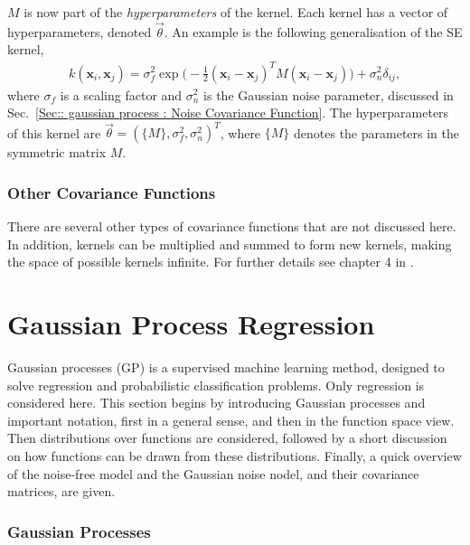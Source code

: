 \documentclass[twoside,english]{uiofysmaster}
\begin{document}
$M$ is now part of the \textit{hyperparameters} of the kernel. Each kernel has a vector of hyperparameters, denoted $\vec{\theta}$. An example is the following generalisation of the SE kernel, 
\begin{align}
k(\textbf{x}_i, \textbf{x}_j) = \sigma_f^2 \exp \big(- \frac{1}{2} (\textbf{x}_i - \textbf{x}_j)^T M (\textbf{x}_i - \textbf{x}_j) \big) + \sigma_n^2 \delta_{ij},
\end{align}
where $\sigma_f$ is a scaling factor and $\sigma_n^2$ is the Gaussian noise parameter, discussed in Sec.~\ref{Sec:: gaussian process : Noise Covariance Function}. The hyperparameters of this kernel are $\vec{\theta} = (\{M\}, \sigma^2_f, \sigma_n^2)^T$, where $\{M\}$ denotes the parameters in the symmetric matrix $M$. 

\subsubsection{Other Covariance Functions}

There are several other types of covariance functions that are not discussed here. In addition, kernels can be multiplied and summed to form new kernels, making the space of possible kernels infinite. For further details see chapter 4 in \cite{rasmussen2006gaussian}.




\section{Gaussian Process Regression}\label{Sec: gaussian process : Gaussian Process Regression}

Gaussian processes (GP) is a supervised machine learning method, designed to solve regression and probabilistic classification problems. Only regression is considered here. This section begins by introducing Gaussian processes and important notation, first in a general sense, and then in the function space view. Then distributions over functions are considered, followed by a short discussion on how functions can be drawn from these distributions. Finally, a quick overview of the noise-free model and the Gaussian noise nodel, and their covariance matrices, are given.

\subsubsection{Gaussian Processes}\label{Sec:: gaussian process : Gaussian Processes}
\end{document}
